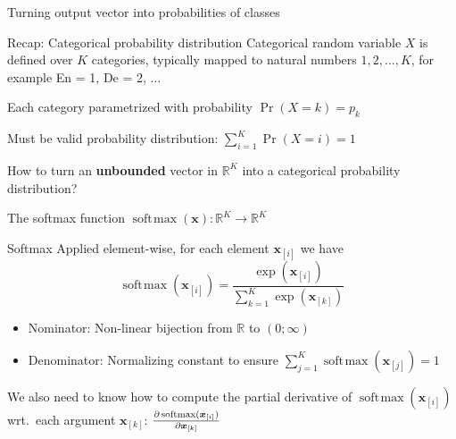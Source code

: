 \documentclass[12pt,aspectratio=169,handout]{beamer}
\DeclareMathOperator*{\softmax}{soft\!\max}
\begin{document}
\begin{frame}{Turning output vector into probabilities of classes}

\begin{block}{Recap: Categorical probability distribution}
Categorical random variable $X$ is defined over $K$ categories, typically mapped to natural numbers $1, 2, \ldots, K$, for example En = 1, De = 2, $\ldots$

\pause
Each category parametrized with probability $\Pr(X = k) = p_k$

\pause
Must be valid probability distribution: $\sum_{i =1}^{K} \Pr(X = i) = 1$
\end{block}

\pause
How to turn an \textbf{unbounded} vector in $\mathbb{R}^K$ into a categorical probability distribution?

\end{frame}

\begin{frame}{The softmax function $\softmax (\bm{x}): \mathbb{R}^K \to \mathbb{R}^K$}

\begin{block}{Softmax}
Applied element-wise, for each element $\bm{x}_{[i]}$ we have
$$
\softmax (\bm{x}_{[i]}) = \frac{\exp(\bm{x}_{[i]})}{
	\sum_{k=1}^{K} \exp(\bm{x}_{[k]})
}
$$
\end{block}

\pause
\begin{itemize}
	\item Nominator: Non-linear bijection from $\mathbb{R}$ to $(0; \infty)$
	\item Denominator: Normalizing constant to ensure $\sum_{j = 1}^{K} \softmax (\bm{x}_{[j]}) = 1$
\end{itemize}

\pause
We also need to know how to compute the partial derivative of $\softmax (\bm{x}_{[i]})$ wrt.\ each argument $\bm{x}_{[k]}$: $\pdv{\softmax (\bm{x}_{[i]})}{\bm{x}_{[k]}}$

\end{frame}
\end{document}
